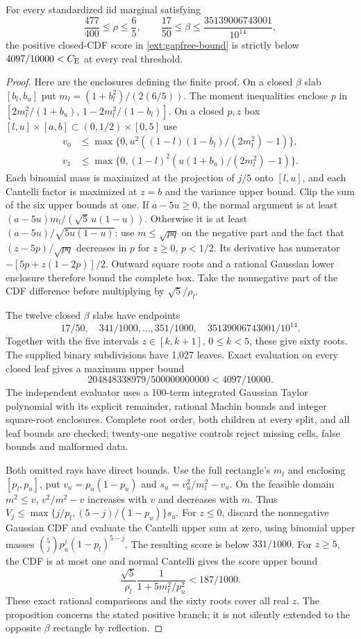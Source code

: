 \begin{proposition}
\label{ext:gapfree5-result}
For every standardized iid marginal satisfying
\[
 \frac{477}{400}\le\rho\le\frac65,\qquad
 \frac{17}{50}\le\beta\le\frac{35139006743001}{10^{14}},
\]
the positive closed-CDF score in \eqref{ext:gapfree-bound} is strictly
below $4097/10000<C_{\mathrm E}$ at every real threshold.
\end{proposition}
\begin{proof}
Here are the enclosures defining the finite proof. On a closed
$\beta$ slab $[b_l,b_u]$ put $m_l=(1+b_l^2)/(2(6/5))$.
The moment inequalities enclose $p$ in
$[2m_l^2/(1+b_u),\,1-2m_l^2/(1-b_l)]$.
On a closed $p,z$ box $[l,u]\times[a,b]\subset(0,1/2)\times[0,5]$
use
\begin{align*}
 v_0&\le\max\{0,u^2((1-l)(1-b_l)/(2m_l^2)-1)\},\\
 v_1&\le\max\{0,(1-l)^2(u(1+b_u)/(2m_l^2)-1)\}.
\end{align*}
Each binomial mass is maximized at the projection of $j/5$ onto
$[l,u]$, and each Cantelli factor is maximized at $z=b$ and the
variance upper bound. Clip the sum of the six upper bounds at one.
If $a-5u\ge0$, the normal argument is at least
$(a-5u)m_l/(\sqrt5\,u(1-u))$.
Otherwise it is at least $(a-5u)/\sqrt{5u(1-u)}$: use
$m\le\sqrt{pq}$ on the negative part and the fact that
$(z-5p)/\sqrt{pq}$ decreases in $p$ for $z\ge0$, $p<1/2$.
Its derivative has numerator $-[5p+z(1-2p)]/2$.
Outward square roots and a rational Gaussian lower enclosure therefore
bound the complete box. Take the nonnegative part of the CDF difference
before multiplying by $\sqrt5/\rho_l$.

The twelve closed $\beta$ slabs have endpoints
\[
 17/50,\quad 341/1000,\ldots,351/1000,\quad
 35139006743001/10^{14}.
\]
Together with the five intervals $z\in[k,k+1]$, $0\le k<5$, these
give sixty roots. The supplied binary subdivisions have 1,027 leaves.
Exact evaluation on every closed leaf gives a maximum upper bound
\[
 204848338979/500000000000<4097/10000.
\]
The independent evaluator uses a 100-term integrated Gaussian Taylor
polynomial with its explicit remainder, rational Machin bounds and
integer square-root enclosures. Complete root order, both children at
every split, and all leaf bounds are checked; twenty-one negative
controls reject missing cells, false bounds and malformed data.

Both omitted rays have direct bounds. Use the full rectangle's $m_l$
and enclosing $[p_l,p_u]$, put $v_u=p_u(1-p_u)$ and
$s_u=v_u^2/m_l^2-v_u$. On the feasible domain $m^2\le v$,
$v^2/m^2-v$ increases with $v$ and decreases with $m$. Thus
$V_j\le\max\{j/p_l,(5-j)/(1-p_u)\}s_u$.
For $z\le0$, discard the nonnegative Gaussian CDF and evaluate the
Cantelli upper sum at zero, using binomial upper masses
$\binom5j p_u^j(1-p_l)^{5-j}$. The resulting score is below $331/1000$.
For $z\ge5$, the CDF is at most one and normal Cantelli gives the
score upper bound
\[
 \frac{\sqrt5}{\rho_l}\frac1{1+5m_l^2/p_u^2}<187/1000.
\]
These exact rational comparisons and the sixty roots cover all real $z$.
The proposition concerns the stated positive branch; it is not silently
extended to the opposite $\beta$ rectangle by reflection.
\end{proof}
